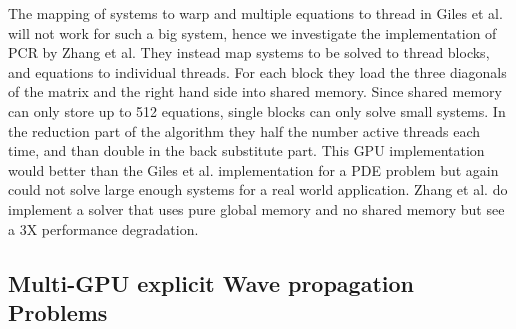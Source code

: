 \documentclass[conference]{IEEEtran}
\begin{document}
The mapping of systems to warp and multiple equations to thread in Giles et al.\cite{Giles} will not work for such a big system, hence we investigate the implementation of PCR by Zhang et al.\cite{Zhang} They instead map systems to be solved to thread blocks, and equations to individual threads. For each block they load the three diagonals of the matrix and the right hand side into shared memory. Since shared memory can only store up to 512 equations, single blocks can only solve small systems. In the reduction part of the algorithm they half the number active threads each time, and than double in the back substitute part. This GPU implementation would better than the Giles et al.\cite{Giles} implementation for a PDE problem but again could not solve large enough systems for a real world application. Zhang et al.\cite{Zhang} do implement a solver that uses pure global memory and no shared memory but see a 3X performance degradation.

\subsection{Multi-GPU explicit Wave propagation Problems}
\end{document}
